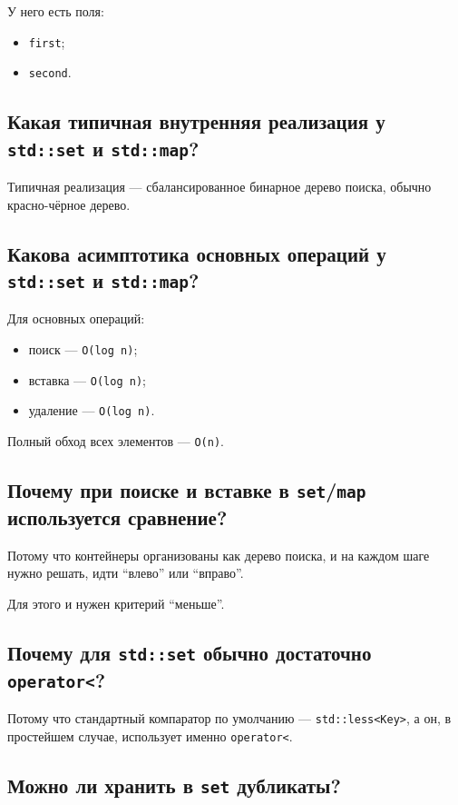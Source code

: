 У него есть поля:
\begin{itemize}
    \item \texttt{first};
    \item \texttt{second}.
\end{itemize}


\subsection{Какая типичная внутренняя реализация у \texttt{std::set} и \texttt{std::map}?}

Типичная реализация --- сбалансированное бинарное дерево поиска, обычно красно-чёрное дерево.


\subsection{Какова асимптотика основных операций у \texttt{std::set} и \texttt{std::map}?}

Для основных операций:
\begin{itemize}
    \item поиск --- \texttt{O(log n)};
    \item вставка --- \texttt{O(log n)};
    \item удаление --- \texttt{O(log n)}.
\end{itemize}

Полный обход всех элементов --- \texttt{O(n)}.


\subsection{Почему при поиске и вставке в \texttt{set}/\texttt{map} используется сравнение?}

Потому что контейнеры организованы как дерево поиска, и на каждом шаге нужно решать, идти ``влево'' или ``вправо''.

Для этого и нужен критерий ``меньше''.


\subsection{Почему для \texttt{std::set} обычно достаточно \texttt{operator<}?}

Потому что стандартный компаратор по умолчанию --- \texttt{std::less<Key>}, а он, в простейшем случае, использует именно \texttt{operator<}.


\subsection{Можно ли хранить в \texttt{set} дубликаты?}

